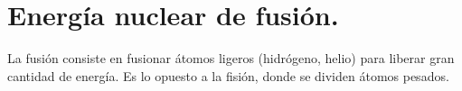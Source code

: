 \chapter{Energía nuclear de fusión.}
La fusión consiste en fusionar átomos ligeros (hidrógeno, helio) para liberar gran cantidad de energía. Es lo opuesto a la fisión, donde se dividen átomos pesados.

